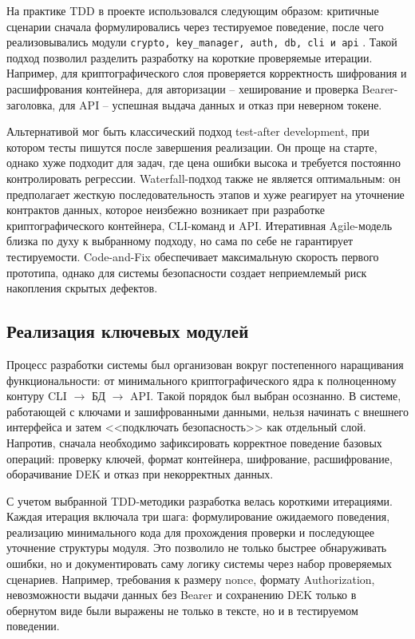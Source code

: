\documentclass[14pt, a4paper]{extarticle}
\renewcommand{\texttt}[1]{%
  {\def\UrlFont{\ttfamily}\nolinkurl{#1}}%
}
\begin{document}
	На практике TDD в проекте использовался следующим образом: критичные сценарии сначала формулировались через тестируемое поведение, после чего реализовывались модули \texttt{crypto, key\_manager, auth, db, cli и api}. Такой подход позволил разделить разработку на короткие проверяемые итерации. Например, для криптографического слоя проверяется корректность шифрования и расшифрования контейнера, для авторизации -- хеширование и проверка Bearer-заголовка, для API -- успешная выдача данных и отказ при неверном токене.
	
	Альтернативой мог быть классический подход test-after development, при котором тесты пишутся после завершения реализации. Он проще на старте, однако хуже подходит для задач, где цена ошибки высока и требуется постоянно контролировать регрессии. Waterfall-подход также не является оптимальным: он предполагает жесткую последовательность этапов и хуже реагирует на уточнение контрактов данных, которое неизбежно возникает при разработке криптографического контейнера, CLI-команд и API. Итеративная Agile-модель близка по духу к выбранному подходу, но сама по себе не гарантирует тестируемости. Code-and-Fix обеспечивает максимальную скорость первого прототипа, однако для системы безопасности создает неприемлемый риск накопления скрытых дефектов.
	
	\subsection{Реализация ключевых модулей}
	
	Процесс разработки системы был организован вокруг постепенного наращивания функциональности: от минимального криптографического ядра к полноценному контуру CLI $\rightarrow$ БД $\rightarrow$ API. Такой порядок был выбран осознанно. В системе, работающей с ключами и зашифрованными данными, нельзя начинать с внешнего интерфейса и затем <<подключать безопасность>> как отдельный слой. Напротив, сначала необходимо зафиксировать корректное поведение базовых операций: проверку ключей, формат контейнера, шифрование, расшифрование, оборачивание DEK и отказ при некорректных данных.
	
	С учетом выбранной TDD-методики разработка велась короткими итерациями. Каждая итерация включала три шага: формулирование ожидаемого поведения, реализацию минимального кода для прохождения проверки и последующее уточнение структуры модуля. Это позволило не только быстрее обнаруживать ошибки, но и документировать саму логику системы через набор проверяемых сценариев. Например, требования к размеру nonce, формату Authorization, невозможности выдачи данных без Bearer и сохранению DEK только в обернутом виде были выражены не только в тексте, но и в тестируемом поведении.
	
\end{document}
